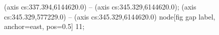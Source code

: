  (axis cs:337.394,6144620.0) -- (axis cs:345.329,6144620.0);
 (axis cs:345.329,577229.0) -- (axis cs:345.329,6144620.0)
  node[fig gap label, anchor=east, pos=0.5] {\texttimes{}11};
